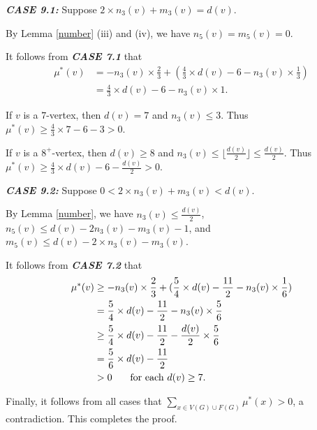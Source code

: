 \documentclass[11pt]{amsart} %
\theoremstyle{definition}
\begin{document}
\textit{\textbf{CASE 9.1:}} Suppose $2\times n_3(v)+m_3(v)=d(v)$.

By Lemma \ref{number} (iii) and (iv), we have $n_5(v)=m_5(v)=0.$ 

It follows from \textit{\textbf{CASE 7.1}} that
\begin{align*}
\mu^*(v)&=-n_3(v)\times\frac{2}{3}+(\frac{4}{3}\times d(v)-6-n_3(v)\times\frac{1}{3})\\
&=\frac{4}{3}\times d(v)-6-n_3(v)\times1.
\end{align*}

If $v$ is a $7$-vertex, then $d(v)=7$ and $n_3(v)\leq3$. 
Thus $\mu^*(v)\geq\frac{4}{3}\times 7-6-3>0.$

If $v$ is a $8^+$-vertex, then $d(v)\geq 8$ 
and $n_3(v)\leq\lfloor\frac{d(v)}{2}\rfloor\leq \frac{d(v)}{2}$. 
Thus $\mu^*(v)\geq\frac{4}{3}\times d(v)-6-\frac{d(v)}{2}>0.$

\textit{\textbf{CASE 9.2:}} Suppose $0<2\times n_3(v)+m_3(v)<d(v)$.

By Lemma \ref{number}, we have $n_3(v)\leq\frac{d(v)}{2}$,  
$n_5(v)\leq d(v)-2n_3(v)-m_3(v)-1$, 
and $m_5(v)\leq d(v)-2\times n_3(v)-m_3(v).$

It follows from \textit{\textbf{CASE 7.2}} that
\begin{align*}
\mu^*(v)&\geq-n_3(v)\times\frac{2}{3}
+(\frac{5}{4}\times d(v)-\frac{11}{2}-n_3(v)\times\frac{1}{6})\\
&=\frac{5}{4}\times d(v)-\frac{11}{2}-n_3(v)\times\frac{5}{6}\\
&\geq \frac{5}{4}\times d(v)
-\frac{11}{2}-\frac{d(v)}{2}\times\frac{5}{6}\\
&=\frac{5}{6}\times d(v)-\frac{11}{2}\\
&>0 \indent\text{ for each }d(v)\geq 7.
\end{align*}


\indent Finally,  it  follows from all cases 
that $\sum_{x\in V(G)\cup F(G)}\mu^*(x)>0$, a contradiction. 
This completes the proof.







\end{document}
